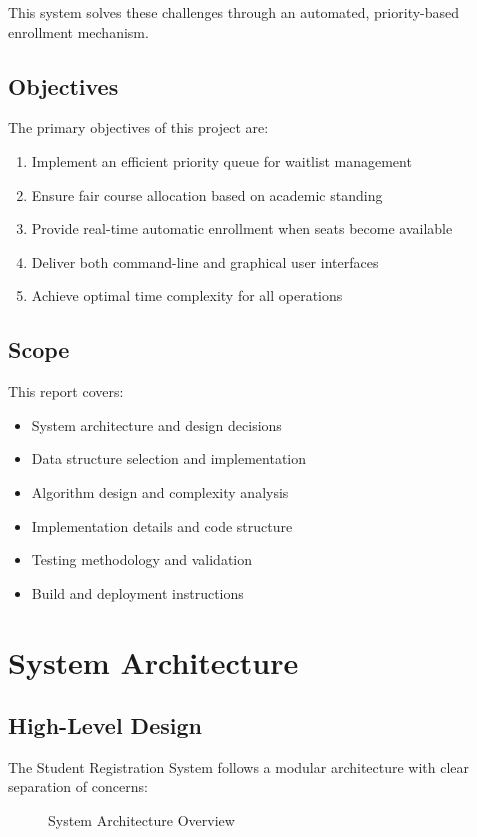 \documentclass[12pt,a4paper]{article}
\begin{document}
This system solves these challenges through an automated, priority-based enrollment mechanism.

\subsection{Objectives}
The primary objectives of this project are:
\begin{enumerate}
    \item Implement an efficient priority queue for waitlist management
    \item Ensure fair course allocation based on academic standing
    \item Provide real-time automatic enrollment when seats become available
    \item Deliver both command-line and graphical user interfaces
    \item Achieve optimal time complexity for all operations
\end{enumerate}

\subsection{Scope}
This report covers:
\begin{itemize}
    \item System architecture and design decisions
    \item Data structure selection and implementation
    \item Algorithm design and complexity analysis
    \item Implementation details and code structure
    \item Testing methodology and validation
    \item Build and deployment instructions
\end{itemize}

\section{System Architecture}

\subsection{High-Level Design}
The Student Registration System follows a modular architecture with clear separation of concerns:

\begin{figure}[h]
\centering
{}
\caption{System Architecture Overview}
\end{figure}
\end{document}
